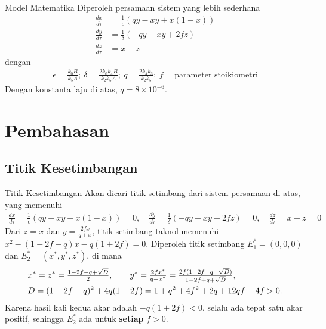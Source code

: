 \documentclass[aspectratio=169]{beamer}
\begin{document}
\begin{frame}{Model Matematika}
    Diperoleh persamaan sistem yang lebih sederhana
    \begin{align*}
        \frac{dx}{d\tau} &= \frac{1}{\epsilon} (qy - xy + x(1-x))\\
        \frac{dy}{d\tau} &= \frac{1}{\delta} (-qy - xy + 2fz)\\
    \frac{dz}{d\tau} &= x-z
    \end{align*}
    dengan
    \begin{align*}
        \epsilon = \frac{k_0 B}{k_5 A}; \ \delta = \frac{2k_0 k_4 B}{k_2 k_5 A}; \ q = \frac{2k_4 k_3}{k_2 k_5}; \ f = \text{parameter stoikiometri}
    \end{align*}
    Dengan konstanta laju di atas, $q = 8 \times 10^{-6}$.
\end{frame}

\section{Pembahasan}

\subsection{Titik Kesetimbangan}

\begin{frame}{Titik Kesetimbangan}
    Akan dicari titik setimbang dari sistem persamaan di atas, yang memenuhi
    \begin{align*}
        \tfrac{dx}{d\tau} = \tfrac{1}{\epsilon} (qy - xy + x(1-x)) = 0, \quad
        \tfrac{dy}{d\tau} = \tfrac{1}{\delta} (-qy - xy + 2fz) = 0, \quad
        \tfrac{dz}{d\tau} = x-z = 0
    \end{align*}
    Dari $z = x$ dan $y = \tfrac{2fx}{q+x}$, titik setimbang taknol memenuhi $x^2 - (1-2f-q)x - q(1+2f) = 0$.
    Diperoleh titik setimbang $E_1^*=(0,0,0)$ dan $E_2^*=(x^*,y^*,z^*)$, di mana
    \begin{align}
        & x^* = z^* = \tfrac{1-2f-q+\sqrt{D}}{2}, \qquad
          y^* = \tfrac{2fx^*}{q+x^*} = \tfrac{2f(1-2f-q+\sqrt{D})}{1-2f+q+\sqrt{D}},  \notag \\
        & D = (1-2f-q)^2 + 4q(1+2f) = 1+q^2+4f^2+2q+12qf-4f > 0. \notag
    \end{align}
    Karena hasil kali kedua akar adalah $-q(1+2f) < 0$, selalu ada tepat satu akar positif,
    sehingga $E_2^*$ ada untuk \textbf{setiap} $f > 0$.
\end{frame}
\end{document}
